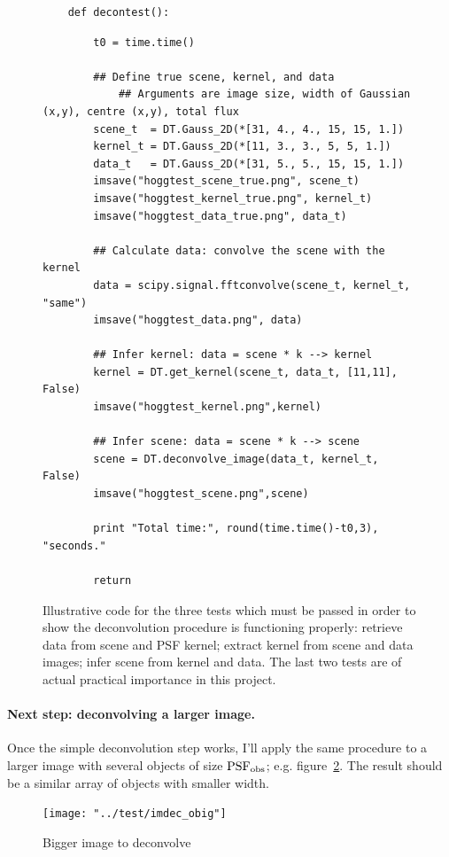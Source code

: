 \documentclass[letterpaper, 11pt]{article}
\def\psfobs{\ensuremath{{\rm PSF_{obs}}}\xspace}
\begin{document}
\begin{figure}
	\begin{verbatim}
	def decontest():
	\end{verbatim}
		\begin{adjustwidth}{1cm}{0cm}\begin{verbatim}	
		t0 = time.time()
		
		## Define true scene, kernel, and data
			## Arguments are image size, width of Gaussian (x,y), centre (x,y), total flux
		scene_t  = DT.Gauss_2D(*[31, 4., 4., 15, 15, 1.])
		kernel_t = DT.Gauss_2D(*[11, 3., 3., 5, 5, 1.])
		data_t   = DT.Gauss_2D(*[31, 5., 5., 15, 15, 1.])
		imsave("hoggtest_scene_true.png", scene_t)
		imsave("hoggtest_kernel_true.png", kernel_t)
		imsave("hoggtest_data_true.png", data_t)
		
		## Calculate data: convolve the scene with the kernel
		data = scipy.signal.fftconvolve(scene_t, kernel_t, "same")
		imsave("hoggtest_data.png", data)
		
		## Infer kernel: data = scene * k --> kernel
		kernel = DT.get_kernel(scene_t, data_t, [11,11], False)
		imsave("hoggtest_kernel.png",kernel)
		
		## Infer scene: data = scene * k --> scene
		scene = DT.deconvolve_image(data_t, kernel_t, False)
		imsave("hoggtest_scene.png",scene)
		
		print "Total time:", round(time.time()-t0,3), "seconds."
		
		return
	\end{verbatim}\end{adjustwidth}
	\caption{Illustrative code for the three tests which must be passed in order to show the deconvolution procedure is functioning properly: retrieve data from scene and PSF kernel; extract kernel from scene and data images; infer scene from kernel and data. The last two tests are of actual practical importance in this project.}
	\label{cde:hoggtest}
\end{figure}

\paragraph{Next step: deconvolving a larger image.} Once the simple deconvolution step works, I'll apply the same procedure to a larger image with several objects of size \psfobs; e.g. figure~\ref{fig:tiled}. The result should be a similar array of objects with smaller width.
\begin{figure}
	\centering
	\texttt{[image: "../test/imdec\_obig"]}
	\caption{Bigger image to deconvolve}
	\label{fig:tiled}
\end{figure}
\end{document}
